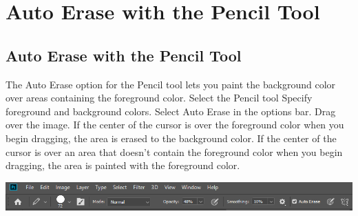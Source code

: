 \documentclass{beamer}
\begin{document}
	\section{Auto Erase with the Pencil Tool}	

	\subsection{Auto Erase with the Pencil Tool}
	\begin{frame}
		\begin{outline}
			\1 The Auto Erase option for the Pencil tool lets you paint the background color over areas containing the foreground color.
			\1 Select the Pencil tool
			\2 Specify foreground and background colors.
			\2 Select Auto Erase in the options bar.
			\2 Drag over the image.
			\3 If the center of the cursor is over the foreground color when you begin dragging, the area is erased to the background color. If the center of the cursor is over an area that doesn’t contain the foreground color when you begin dragging, the area is painted with the foreground color.
\end{outline}
\begin{center}
	\includegraphics[width = 1.0\textwidth]{images/auto erase.png}
\end{center}
\end{frame}
\end{document}
